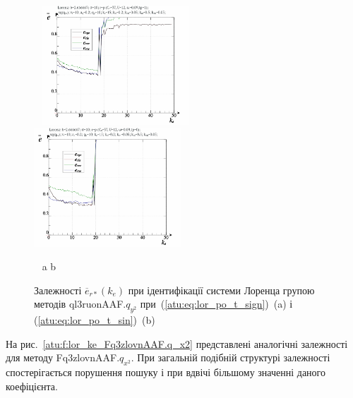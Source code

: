 \begin{figure}[ht!]
  \begin{center}
    ~ \hfill
    \includegraphics[width=0.49\textwidth]{p/cha/lor/ql3ruonAAF/lor_ql3ruonAAF_qy2-p_k_e_e_sign.png}
    \hfill
    \includegraphics[width=0.49\textwidth]{p/cha/lor/ql3ruonAAF/lor_ql3ruonAAF_qy2-p_k_e_e_sin.png}
    \hfill ~
  \end{center}
  \vspace{-1.0ex}
  \begin{center}
    ~ \hfill a \hfill\hfill b \hfill ~
  \end{center}
  \vspace{-1.5ex}
  \caption{Залежності $ \overline{e}_{r *} (k_e) $ при ідентифікації системи Лоренца групою методів ql3ruonAAF.$q_{y^2} $ при~(\ref{atu:eq:lor_po_t_sign})~(a) і (\ref{atu:eq:lor_po_t_sin})~(b)}
\label{atu:f:lor_ke_ql3ruonAAF.q_y2}
\end{figure}

На рис.~\ref{atu:f:lor_ke_Fq3zlovnAAF.q_x2} представлені аналогічні залежності
для методу Fq3zlovnAAF.$q_{x^2} $. При загальній подібній структурі залежності
спостерігається порушення пошуку і при вдвічі більшому значенні
даного коефіцієнта.

